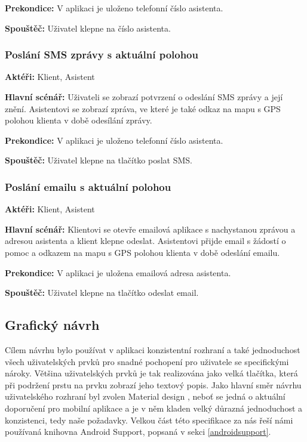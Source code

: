 \documentclass[czech,master,public,dept460,male,java,cpdeclaration]{diploma}
\newcommand{\usecase}[2]{\subsubsection{#1}\label{#2}}
\begin{document}
\vspace{0.1cm}
\noindent
\textbf{Prekondice:} V aplikaci je uloženo telefonní číslo asistenta.

\vspace{0.1cm}
\noindent
\textbf{Spouštěč:} Uživatel klepne na číslo asistenta.

\usecase{Poslání SMS zprávy s aktuální polohou}{pomocsms}
\textbf{Aktéři:} Klient, Asistent

\vspace{0.1cm}
\noindent
\textbf{Hlavní scénář:} Uživateli se zobrazí potvrzení o odeslání SMS zprávy a její znění.
Asistentovi se zobrazí zpráva, ve které je také odkaz na mapu s GPS polohou klienta v době odesílání zprávy.

\vspace{0.1cm}
\noindent
\textbf{Prekondice:} V aplikaci je uloženo telefonní číslo asistenta.

\vspace{0.1cm}
\noindent
\textbf{Spouštěč:} Uživatel klepne na tlačítko poslat SMS.


\usecase{Poslání emailu s aktuální polohou}{pomocemail}
\textbf{Aktéři:} Klient, Asistent

\vspace{0.1cm}
\noindent
\textbf{Hlavní scénář:} Klientovi se otevře emailová aplikace s nachystanou zprávou a adresou asistenta
a klient klepne odeslat. Asistentovi přijde email s žádostí o pomoc a odkazem na mapu s GPS polohou
klienta v době odeslání emailu.

\vspace{0.1cm}
\noindent
\textbf{Prekondice:} V aplikaci je uložena emailová adresa asistenta.

\vspace{0.1cm}
\noindent
\textbf{Spouštěč:} Uživatel klepne na tlačítko odeslat email.

\subsection{Grafický návrh}
Cílem návrhu bylo používat v aplikaci konzistentní rozhraní a také jednoduchost všech uživatelských
prvků pro snadné pochopení pro uživatele se specifickými nároky. Většina uživatelských prvků je tak
realizována jako velká tlačítka, která při podržení prstu na prvku zobrazí jeho textový popis.
Jako hlavní směr návrhu uživatelského rozhraní byl zvolen Material design \cite{materialdesign}, neboť se jedná o aktuální
doporučení pro mobilní aplikace a je v něm kladen velký důrazná jednoduchost a konzistenci,
tedy naše požadavky. Velkou část této specifikace za nás řeší námi používaná knihovna Android Support,
popsaná v sekci \ref{androidsupport}.
\end{document}
